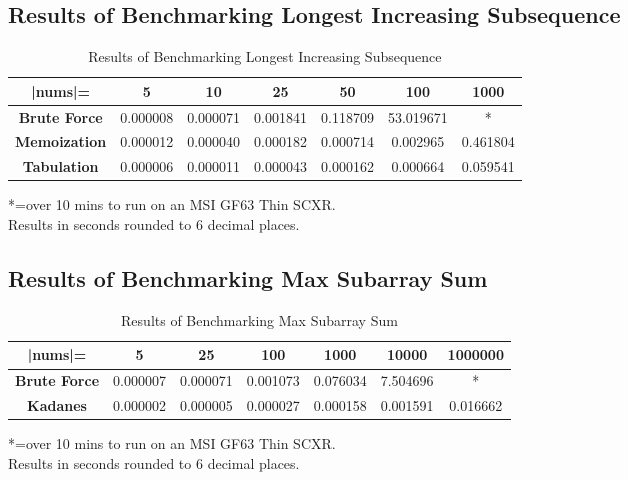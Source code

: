 \subsection{Results of Benchmarking Longest Increasing Subsequence}
\begin{table}[H]
    \centering
    \begin{tabular}{|c|c|c|c|c|c|c|}
        \hline
        \textbf{|nums|=}  & \textbf{5} & \textbf{10} & \textbf{25} & \textbf{50} & \textbf{100}  & \textbf{1000} \\
        \hline
        \textbf{Brute Force} & 0.000008 & 0.000071 & 0.001841 & 0.118709 & 53.019671 & * \\
        \hline
        \textbf{Memoization} & 0.000012 & 0.000040 & 0.000182 & 0.000714 & 0.002965 & 0.461804 \\
        \hline
        \textbf{Tabulation} & 0.000006 & 0.000011 & 0.000043 & 0.000162 & 0.000664 & 0.059541 \\
        \hline
    \end{tabular}
    \caption{Results of Benchmarking Longest Increasing Subsequence}
\end{table}
*=over 10 mins to run on an MSI GF63 Thin SCXR.\\
Results in seconds rounded to 6 decimal places.

\subsection{Results of Benchmarking Max Subarray Sum}
\begin{table}[H]
    \centering
    \begin{tabular}{|c|c|c|c|c|c|c|}
        \hline
        \textbf{|nums|=}  & \textbf{5} & \textbf{25} & \textbf{100} & \textbf{1000} & \textbf{10000}  & \textbf{1000000} \\
        \hline
        \textbf{Brute Force} & 0.000007 & 0.000071 & 0.001073 & 0.076034 & 7.504696 & * \\
        \hline
        \textbf{Kadanes} & 0.000002 & 0.000005 & 0.000027 & 0.000158 & 0.001591 & 0.016662 \\
        \hline
    \end{tabular}
    \caption{Results of Benchmarking Max Subarray Sum}
\end{table}
*=over 10 mins to run on an MSI GF63 Thin SCXR.\\
Results in seconds rounded to 6 decimal places.

